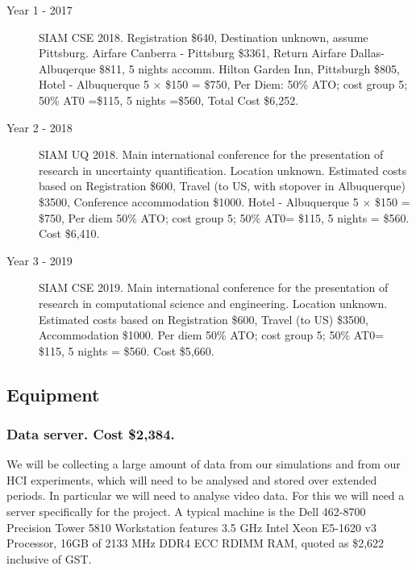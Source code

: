 \documentclass[a4paper,fontsize=12pt]{scrartcl}
\begin{document}
\begin{description}
\item[Year 1 - 2017] SIAM CSE 2018.
Registration \$640, 
Destination unknown, assume Pittsburg.
Airfare Canberra - Pittsburg \$3361,
Return Airfare Dallas-Albuqerque \$811,
5 nights accomm. Hilton Garden Inn, Pittsburgh \$805,  
Hotel - Albuquerque 5 $\times$  \$150 = \$750,
Per Diem: 50\% ATO; cost group 5; 50\% AT0 =\$115, 5 nights =\$560, Total Cost \$6,252.

\item[Year 2 - 2018] SIAM UQ 2018.
Main international conference for the presentation of research in uncertainty quantification. Location unknown.
Estimated costs based on 
Registration \$600,
Travel (to US, with stopover in Albuquerque) \$3500, 
Conference accommodation \$1000.
Hotel - Albuquerque 5 $\times$  \$150 = \$750,
Per diem 50\% ATO; cost group 5; 50\% AT0= \$115, 5 nights = \$560. Cost \$6,410.

\item[Year 3 - 2019]  SIAM CSE 2019.
Main international conference for the presentation of research in computational science and engineering. Location unknown.
Estimated costs based on 
Registration \$600,
Travel (to US) \$3500, 
Accommodation \$1000.
Per diem 50\% ATO; cost group 5; 50\% AT0= \$115, 5 nights = \$560. Cost \$5,660.

\end{description}

\subsection*{Equipment}

\subsubsection*{Data server. Cost \$2,384.}

We will be collecting a large amount of data from our simulations and from our HCI experiments, which will need to be analysed and stored over extended periods. In particular we will need to analyse video data.  For this we will need a server specifically for the project. A typical machine is the Dell 462-8700 Precision Tower 5810 Workstation features 3.5 GHz Intel Xeon E5-1620 v3 Processor, 16GB of 2133 MHz DDR4 ECC RDIMM RAM, quoted as \$2,622 inclusive of GST.  


\end{document}
